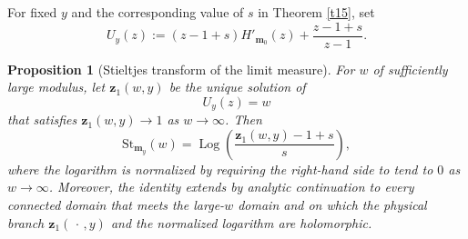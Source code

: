 \documentclass[11pt]{amsart}
\theoremstyle{plain}
\newtheorem{proposition}[theorem]{Proposition}
\numberwithin{equation}{section}
\numberwithin{theorem}{section}
\numberwithin{figure}{section}
\begin{document}
 
  For fixed $y$ and the corresponding value of $s$ in Theorem \ref{t15}, set
\begin{equation}
U_y(z):=(z-1+s)H'_{\mathbf m_0}(z)+\frac{z-1+s}{z-1}.
\label{duyz}
\end{equation} 
  

\begin{proposition}[Stieltjes transform of the limit measure]
\label{prop:stieltjes-root}
For $w$ of sufficiently large modulus, let $\mathbf z_1(w,y)$ be the unique
solution of
 \[
U_y(z)=w
\]
that    satisfies $\mathbf z_1(w,y)\to1$ as $w\to\infty$. Then
\begin{equation}
\mathrm{St}_{\mathbf m_y}(w)
=
\operatorname{Log}\!\left(
\frac{\mathbf z_1(w,y)-1+s}{s}
\right),
\label{eq:st-root-large-w}
\end{equation}
where the logarithm is normalized by requiring the right-hand side to tend to
$0$ as $w\to\infty$.  Moreover, the identity extends by analytic
continuation to every connected domain that meets the large-$w$ domain and on
which the physical branch $\mathbf z_1(\,\cdot\,,y)$ and the normalized
logarithm are holomorphic.
\end{proposition}
\end{document}
